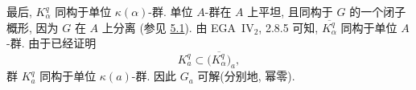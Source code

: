 最后, \(K_\alpha^q\) 同构于单位 \(\kappa(\alpha)\)-群.
单位 \(A\)-群在 \(A\) 上平坦,
且同构于 \(G\) 的一个闭子概形,
因为 \(G\) 在 \(A\) 上分离
\textup{(参见 \hyperref[prop:sga3-VIB-5.1]{5.1})}.
由 EGA~IV\(_2\), 2.8.5 可知,
\(\overline{K_\alpha^q}\) 同构于单位 \(A\)-群.
由于已经证明
\[
  K_a^q\subset\bigl(\overline{K_\alpha^q}\bigr)_a,
\]
群 \(K_a^q\) 同构于单位 \(\kappa(a)\)-群.
因此 \(G_a\) 可解\textup{(分别地, 幂零)}.

